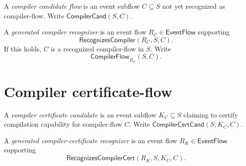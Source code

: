 \begin{definition}
\label{def:self-hosting-compiler-candidate-recognizer}
A \emph{compiler candidate flow} is an event subflow $C\subseteq S$ not yet recognized as compiler-flow. Write $\mathsf{CompilerCand}(S,C)$.

A \emph{generated compiler recognizer} is an event flow $R_C\in\mathsf{EventFlow}$ supporting
$$
  \mathsf{RecognizesCompiler}(R_C,S,C).
$$
If this holds, $C$ is a recognized compiler-flow in $S$. Write
$$
  \mathsf{CompilerFlow}_{R_C}(S,C).
$$
\end{definition}

\section{Compiler certificate-flow}
\label{sec:self-hosting-compiler-certificate}

\begin{definition}
\label{def:self-hosting-compiler-cert-candidate-recognizer}
A \emph{compiler certificate candidate} is an event subflow $K_C\subseteq S$ claiming to certify compilation capability for compiler-flow $C$. Write $\mathsf{CompilerCertCand}(S,K_C,C)$.

A \emph{generated compiler-certificate recognizer} is an event flow $R_K\in\mathsf{EventFlow}$ supporting
$$
  \mathsf{RecognizesCompilerCert}(R_K,S,K_C,C).
$$
\end{definition}

